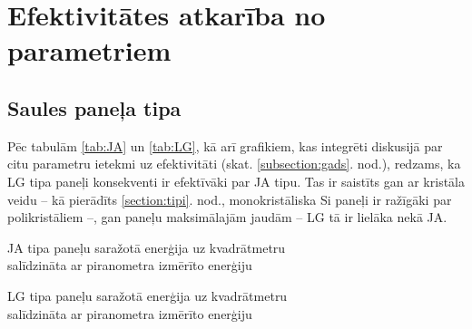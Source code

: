 \section{Efektivitātes atkarība no parametriem}
\subsection{Saules paneļa tipa} \label{subsection:tipi}

Pēc tabulām \ref{tab:JA} un \ref{tab:LG}, kā arī grafikiem, kas integrēti diskusijā par citu parametru ietekmi uz efektivitāti (skat. \ref{subsection:gads}. nod.), redzams, ka LG tipa paneļi konsekventi ir efektīvāki par JA tipu. Tas ir saistīts gan ar kristāla veidu -- kā pierādīts \ref{section:tipi}. nod.,  monokristāliska Si paneļi ir ražīgāki par polikristāliem --, gan paneļu maksimālajām jaudām -- LG tā ir lielāka nekā JA.

\begin{table}[h!]
    \caption{JA tipa paneļu saražotā enerģija uz kvadrātmetru\\ salīdzināta ar piranometra izmērīto enerģiju}
    \begin{center}
    
    \end{center} \label{tab:JA}
\end{table}
\begin{table}[h!]
    \caption{LG tipa paneļu saražotā enerģija uz kvadrātmetru\\ salīdzināta ar piranometra izmērīto enerģiju}
    \begin{center}
    
    \end{center} \label{tab:LG}
\end{table}

